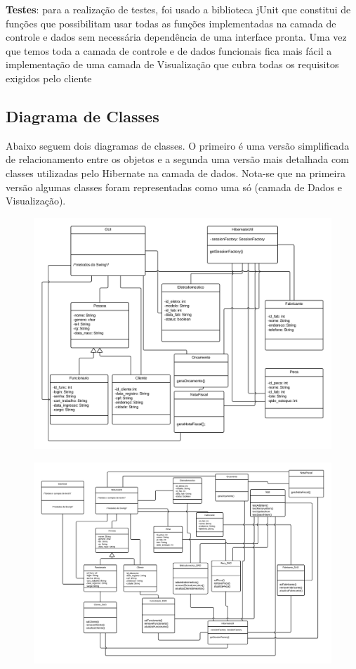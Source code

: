 \documentclass[a4paper,10pt]{article}
\begin{document}
\textbf{Testes}: para a realização de testes, foi usado a biblioteca jUnit que constitui de funções que possibilitam usar todas as funções implementadas na camada de controle e dados sem necessária dependência de uma interface pronta. Uma vez que temos toda a camada de controle e de dados funcionais fica mais fácil a implementação de uma camada de Visualização que cubra todas os requisitos exigidos pelo cliente

\subsection{Diagrama de Classes}

Abaixo seguem dois diagramas de classes. O primeiro é uma versão simplificada de relacionamento entre os objetos e a segunda uma versão mais detalhada com classes utilizadas pelo Hibernate na camada de dados. Nota-se que na primeira versão algumas classes foram representadas como uma só (camada de Dados e Visualização).

\begin{figure}[H]
\centering
\includegraphics[width=1\textwidth]{pic/classe_11.png}
\end{figure}

\begin{figure}[H]
\centering
\includegraphics[width=1\textwidth]{pic/classe_2.png}
\end{figure}
\end{document}
